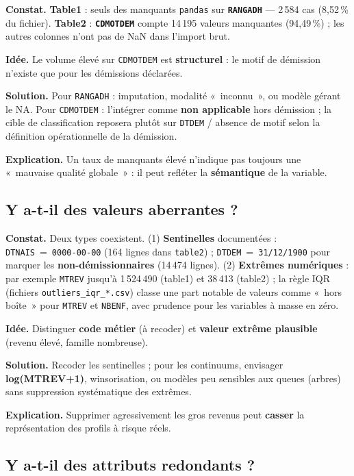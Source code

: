 \documentclass[11pt,a4paper]{article}
\begin{document}
\textbf{Constat.} \textbf{Table1} : seuls des manquants \texttt{pandas} sur \textbf{\texttt{RANGADH}} --- 2\,584 cas (8{,}52\,\% du fichier). \textbf{Table2} : \textbf{\texttt{CDMOTDEM}} compte 14\,195 valeurs manquantes (94{,}49\,\%) ; les autres colonnes n'ont pas de NaN dans l'import brut.

\textbf{Idée.} Le volume élevé sur \texttt{CDMOTDEM} est \textbf{structurel} : le motif de démission n'existe que pour les démissions déclarées.

\textbf{Solution.} Pour \texttt{RANGADH} : imputation, modalité «~inconnu~», ou modèle gérant le NA. Pour \texttt{CDMOTDEM} : l'intégrer comme \textbf{non applicable} hors démission ; la cible de classification reposera plutôt sur \texttt{DTDEM} / absence de motif selon la définition opérationnelle de la démission.

\textbf{Explication.} Un taux de manquants élevé n'indique pas toujours une «~mauvaise qualité globale~» : il peut refléter la \textbf{sémantique} de la variable.

\subsection{Y a-t-il des valeurs aberrantes ?}

\textbf{Constat.} Deux types coexistent. (1) \textbf{Sentinelles} documentées : \texttt{DTNAIS}~=~\texttt{0000-00-00} (164 lignes dans \texttt{table2}) ; \texttt{DTDEM}~=~\texttt{31/12/1900} pour marquer les \textbf{non-démissionnaires} (14\,474 lignes). (2) \textbf{Extrêmes numériques} : par exemple \texttt{MTREV} jusqu'à 1\,524\,490 (table1) et 38\,413 (table2) ; la règle IQR (fichiers \texttt{outliers\_iqr\_*.csv}) classe une part notable de valeurs comme «~hors boîte~» pour \texttt{MTREV} et \texttt{NBENF}, avec prudence pour les variables à masse en zéro.

\textbf{Idée.} Distinguer \textbf{code métier} (à recoder) et \textbf{valeur extrême plausible} (revenu élevé, famille nombreuse).

\textbf{Solution.} Recoder les sentinelles ; pour les continuums, envisager \textbf{log(MTREV+1)}, winsorisation, ou modèles peu sensibles aux queues (arbres) sans suppression systématique des extrêmes.

\textbf{Explication.} Supprimer agressivement les gros revenus peut \textbf{casser} la représentation des profils à risque réels.

\subsection{Y a-t-il des attributs redondants ?}
\end{document}
